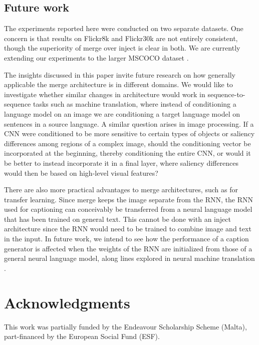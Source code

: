 \documentclass[11pt,letterpaper]{article}
\begin{document}
\subsection{Future work}\label{sec:future}
The experiments reported here were conducted on two separate datasets. One concern is that results on Flickr8k and Flickr30k are not entirely consistent, though the superiority of merge over inject is clear in both. We are currently extending our experiments to the larger MSCOCO dataset \cite{Lin2014}.

The insights discussed in this paper invite future research on how generally applicable the merge architecture is in different domains. We would like to investigate whether similar changes in architecture would work in sequence-to-sequence tasks such as machine translation, where instead of conditioning a language model on an image we are conditioning a target language model on sentences in a source language. A similar question arises in image processing. If a CNN were conditioned to be more sensitive to certain types of objects or saliency differences among regions of a complex image, should the conditioning vector be incorporated at the beginning, thereby conditioning the entire CNN, or would it be better to instead incorporate it in a final layer, where saliency differences would then be based on high-level visual features?

There are also more practical advantages to merge architectures, such as for transfer learning. Since merge keeps the image separate from the RNN, the RNN used for captioning can conceivably be transferred from a neural language model that has been trained on general text. This cannot be done with an inject architecture since the RNN would need to be trained to combine image and text in the input. In future work, we intend to see how the performance of a caption generator is affected when the weights of the RNN are initialized from those of a general neural language model, along lines explored in neural machine translation \cite{Ramachandran2016}.

\section*{Acknowledgments}
This work was partially funded by the Endeavour Scholarship Scheme (Malta), part-financed by the European Social Fund (ESF).



\end{document}
